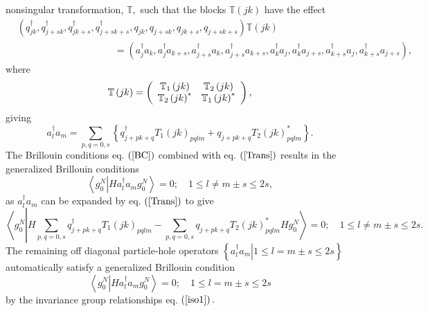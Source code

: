 \documentclass[aps,preprint]{revtex4}%
\begin{document}
nonsingular transformation, $\mathbb{T},$ such that the blocks $\mathbb{T}%
\left(  jk\right)  $ have the effect
\begin{align}
&  \left(  q_{jk}^{\dagger},q_{j+sk}^{\dagger},q_{jk+s}^{\dagger}%
,q_{j+sk+s}^{\dagger},q_{jk},q_{j+sk},q_{jk+s},q_{j+sk+s}\right)
\mathbb{T}\left(  jk\right) \nonumber\\
&  \qquad\qquad\qquad\qquad\qquad\left.  =\right.  \left(  a_{j}^{\dagger
}a_{k},a_{j}^{\dagger}a_{k+s},a_{j+s}^{\dagger}a_{k},a_{j+s}^{\dagger}%
a_{k+s},a_{k}^{\dagger}a_{j},a_{k}^{\dagger}a_{j+s},a_{k+s}^{\dagger}%
a_{j},a_{k+s}^{\dagger}a_{j+s}\right)  ,
\end{align}
where
\begin{equation}
\mathbb{T}\left(  jk\right)  =\left(
\begin{array}
[c]{cc}%
\mathbb{T}_{1}\left(  jk\right)  & \mathbb{T}_{2}\left(  jk\right) \\
\mathbb{T}_{2}\left(  jk\right)  ^{\ast} & \mathbb{T}_{1}\left(  jk\right)
^{\ast}%
\end{array}
\right)  ,
\end{equation}
giving
\begin{equation}
a_{l}^{\dagger}a_{m}=\sum_{p,q=0,s}\left\{  q_{j+pk+q}^{\dagger}T_{1}\left(
jk\right)  _{pqlm}+q_{j+pk+q}T_{2}\left(  jk\right)  _{pqlm}^{\ast}\right\}  .
\label{Trans}%
\end{equation}
The Brillouin conditions eq. $\left(  \ref{BC}\right)  $ combined with eq.
$\left(  \ref{Trans}\right)  $ results in the generalized Brillouin
conditions
\begin{equation}
\left\langle g_{0}^{N}\left\vert Ha_{l}^{\dagger}a_{m}\right.  g_{0}%
^{N}\right\rangle =0;\quad1\leq l\neq m\pm s\leq2s, \label{GBC}%
\end{equation}
as $a_{l}^{\dagger}a_{m}$ can be expanded by eq. $\left(  \ref{Trans}\right)
$ to give%
\begin{equation}
\left\langle g_{0}^{N}\left\vert H\sum_{p,q=0,s}q_{j+pk+q}^{\dagger}%
T_{1}\left(  jk\right)  _{pqlm}-\sum_{p,q=0,s}q_{j+pk+q}T_{2}\left(
jk\right)  _{pqlm}^{\ast}Hg_{0}^{N}\right.  \right\rangle =0;\quad1\leq l\neq
m\pm s\leq2s.
\end{equation}
The remaining off diagonal particle-hole operators $\left\{  \left.
a_{l}^{\dagger}a_{m}\right\vert 1\leq l=m\pm s\leq2s\right\}  $ automatically
satisfy a generalized Brillouin condition
\begin{equation}
\left\langle g_{0}^{N}\left\vert Ha_{l}^{\dagger}a_{m}g_{0}^{N}\right.
\right\rangle =0;\quad1\leq l=m\pm s\leq2s \label{ph}%
\end{equation}
by the invariance group relationships eq. $\left(  \ref{iso1}\right)  .$
\end{document}
